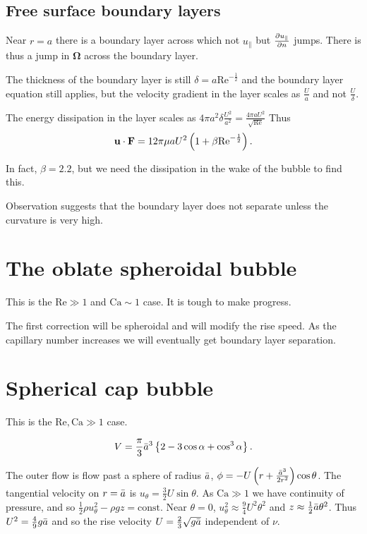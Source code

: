 \documentclass{notes}
\newcommand{\bo}{\boldsymbol{\Omega}}
\newcommand{\Rey}{\mathrm{Re}}
\newcommand{\Ca}{\mathrm{Ca}}
\theoremstyle{plain}
\begin{document}
\subsection*{Free surface boundary layers}

Near $r=a$ there is a boundary layer across which not $u_\parallel$
but $\frac{\partial u_\parallel}{\partial n}$ jumps.  There is thus a jump in $\bo$ across
the boundary layer.

The thickness of the boundary layer is still $\delta = a \Rey^{-\frac{1}{2}}$
and the boundary layer equation still applies, but the velocity gradient
in the layer scales as $\frac{U}{a}$ and not $\frac{U}{\delta}$.

The energy dissipation in the layer scales as $4 \pi a^2 \delta
\frac{U^2}{a^2} = \frac{4 \pi a U^2}{\sqrt{\Rey}}$  Thus
\[
\vu \cdot \vF = 12 \pi \mu a U^2 \left( 1 + \beta \Rey^{-\frac{1}{2}} \right).
\]

In fact, $\beta = 2.2$, but we need the dissipation in the wake of the
bubble to find this.

Observation suggests that the boundary layer does not separate unless
the curvature is very high.

\section{The oblate spheroidal bubble}

This is the $\Rey \gg 1$ and $\Ca \sim 1$ case.  It is tough to make
progress.

\vspace{1in}

The first correction will be spheroidal and will modify the rise speed.  As
the capillary number increases we will eventually get boundary layer
separation.

\section{Spherical cap bubble}

This is the $\Rey, \Ca \gg 1$ case.

\vspace{2in}

\[
V = \frac{\pi}{3} \Bar{a}^3 \left\{ 2 - 3 \cos \alpha + \cos^3 \alpha
\right\}.
\]

The outer flow is flow past a sphere of radius $\Bar{a}$,
$\phi = -U \left( r + \frac{\Bar{a}^3}{2 r^2} \right) \cos \theta$.
The tangential velocity on $r = \Bar{a}$ is $u_\theta = \tfrac{3}{2} U
\sin \theta$.  As $\Ca \gg 1$ we have continuity of pressure,
and so $\tfrac{1}{2} \rho u_\theta^2 - \rho g z = \text{const}$.
Near $\theta = 0$, $u_\theta^2 \approx \tfrac{9}{4} U^2 \theta^2$ and
$z \approx \tfrac{1}{2} \Bar{a} \theta^2$.  Thus $U^2 = \tfrac{4}{9}
g \Bar{a}$ and so the rise velocity $U = \tfrac{2}{3} \sqrt{g \Bar{a}}$
independent of $\nu$.
\end{document}
